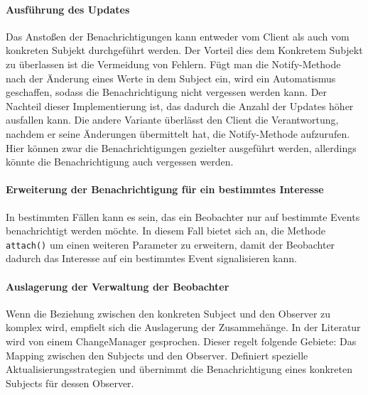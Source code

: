 \paragraph{Ausführung des Updates} Das Anstoßen der Benachrichtigungen kann entweder vom Client als auch vom konkreten Subjekt durchgeführt werden. Der Vorteil dies dem Konkretem Subjekt zu überlassen ist die Vermeidung von Fehlern. Fügt man die Notify-Methode nach der Änderung eines Werte in dem Subject ein, wird ein Automatismus geschaffen, sodass die Benachrichtigung nicht vergessen werden kann. Der Nachteil dieser Implementierung ist, das dadurch die Anzahl der Updates höher ausfallen kann. Die andere Variante überlässt den Client die Verantwortung, nachdem er seine Änderungen übermittelt hat, die Notify-Methode aufzurufen. Hier können zwar die Benachrichtigungen gezielter ausgeführt werden, allerdings könnte die Benachrichtigung auch vergessen werden.



\paragraph{Erweiterung der Benachrichtigung für ein bestimmtes Interesse} In bestimmten Fällen kann es sein, das ein Beobachter nur auf bestimmte Events benachrichtigt werden möchte. In diesem Fall bietet sich an,  die Methode \texttt{attach()} um einen weiteren Parameter zu erweitern, damit der Beobachter dadurch das Interesse auf ein bestimmtes Event signalisieren kann.

\paragraph{Auslagerung der Verwaltung der Beobachter} Wenn die Beziehung zwischen den konkreten Subject und den Observer zu komplex wird, empfielt sich die Auslagerung der Zusammehänge. In der Literatur wird von einem ChangeManager gesprochen. Dieser regelt folgende Gebiete: Das Mapping zwischen den Subjects und den Observer. Definiert spezielle Aktualisierungsstrategien und übernimmt die Benachrichtigung eines konkreten Subjects für dessen Observer.


